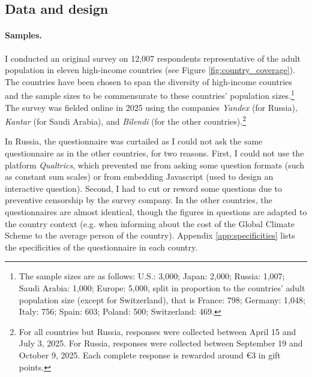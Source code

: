\documentclass[12pt,english]{article}
\begin{document}
\begin{bibunit}


\section{Data and design\label{sec:data}}

\paragraph{Samples.}
I conducted an original survey on 12,007 respondents representative of the adult population in eleven high-income countries (see Figure \ref{fig:country_coverage}). The countries have been chosen to span the diversity of high-income countries and the sample sizes to be commensurate to these countries' population sizes.\footnote{The sample sizes are as follows: U.S.: 3,000; Japan: 2,000; Russia: 1,007; Saudi Arabia: 1,000; Europe: 5,000, split in proportion to the countries' adult population size (except for Switzerland), that is France: 798; Germany: 1,048; Italy: 756; Spain: 603; Poland: 500; Switzerland: 469.} %
The survey was fielded online in 2025 using the companies \textit{Yandex} (for Russia), \textit{Kantar} (for Saudi Arabia), and \textit{Bilendi} (for the other countries).\footnote{For all countries but Russia, responses were collected between April 15 and July 3, 2025. For Russia, responses were collected between September 19 and October 9, 2025. Each complete response is rewarded around \euro{}3 in gift points.} 

In Russia, the questionnaire was curtailed as I could not ask the same questionnaire as in the other countries, for two reasons. First, I could not use the platform \textit{Qualtrics}, which prevented me from asking some question formats (such as constant sum scales) or from embedding Javascript (used to design an interactive question). Second, I had to cut or reword some questions due to preventive censorship by the survey company. In the other countries, the questionnaires are almost identical, though the figures in questions are adapted to the country context (e.g. when informing about the cost of the Global Climate Scheme to the average person of the country). Appendix \ref{app:specificities} lists the specificities of the questionnaire in each country.


\end{bibunit}
\end{document}
